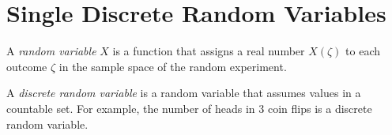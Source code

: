 \section{Single Discrete Random Variables}\label{sec:Single Discrete Random Variables}
\begin{definition}\label{def:Random Variable, Simple}
  A \emph{random variable} $X$ is a function that assigns a real number $X \left( \zeta \right)$ to each outcome $\zeta$ in the sample space of the random experiment.
\end{definition}
\begin{definition}\label{def:Discrete Random Variable}
  A \emph{discrete random variable} is a random variable that assumes values in a countable set. For example, the number of heads in 3 coin flips is a discrete random variable.
\end{definition}

